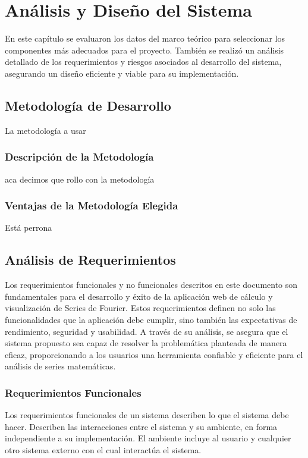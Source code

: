 \chapter{Análisis y Diseño del Sistema}\label{ch:Análisis y diseño del sistema}
En este capítulo se evaluaron los datos del marco teórico para seleccionar los componentes más adecuados para el proyecto. También se realizó un análisis detallado de los requerimientos y riesgos asociados al desarrollo del sistema, asegurando un diseño eficiente y viable para su implementación.

\section{Metodología de Desarrollo}
La metodología a usar	
\subsection{Descripción de la Metodología}
aca decimos que rollo con la metodología
\subsection{Ventajas de la Metodología Elegida}
Está perrona

\section{Análisis de Requerimientos}
Los requerimientos funcionales y no funcionales descritos en este documento son fundamentales para el desarrollo y éxito de la aplicación web de cálculo y visualización de Series de Fourier. Estos requerimientos definen no solo las funcionalidades que la aplicación debe cumplir, sino también las expectativas de rendimiento, seguridad y usabilidad. A través de su análisis, se asegura que el sistema propuesto sea capaz de resolver la problemática planteada de manera eficaz, proporcionando a los usuarios una herramienta confiable y eficiente para el análisis de series matemáticas.
\subsection{Requerimientos Funcionales}
Los requerimientos funcionales de un sistema describen lo que el sistema debe hacer. Describen las interacciones entre el sistema y su ambiente, en forma independiente a su implementación. El ambiente incluye al usuario y cualquier otro sistema externo con el cual interactúa el sistema.

